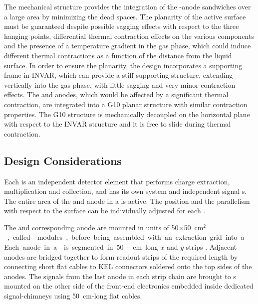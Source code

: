 The  mechanical structure provides the integration of the -anode sandwiches over a large area by minimizing the dead spaces. The planarity of the active surface must be guaranteed despite possible sagging effects with respect to the three hanging points, differential thermal contraction effects on the various  components and the presence of a temperature gradient in the gas phase, which could induce different thermal contractions as a function of the distance from the liquid surface. In order to %
ensure the planarity, the design %
incorporates a supporting frame in INVAR, which %
can provide a stiff supporting structure, extending vertically into the gas phase, with little sagging and %
very minor contraction effects. The  and anodes, which would be affected by a significant thermal contraction, are integrated into a G10 planar structure with similar contraction %
properties. The G10 structure is mechanically decoupled on the horizontal plane with respect to the INVAR structure  and it is free to slide during thermal contraction. 

\subsection{Design Considerations}
\label{sec:fddp-crp-des-consid}

Each  is an independent detector element that performs charge
extraction, multiplication and collection, and has its own  system and independent signal \fdth{}s. The entire area of the  and anode in a  is active. The position and the parallelism with respect to the \lar surface can be individually adjusted for each .

The  and corresponding anode are mounted in units of \num{50}$\times$\SI{50}{cm$^2$}, called %
 modules, before being assembled with an extraction grid into a . Each anode in a  is segmented in 50-cm long $x$ and $y$ strips . Adjacent  anodes are bridged together to form readout strips of the required length by connecting short flat cables to KEL connectors soldered onto the top sides of the anodes. The signals from the last anode in each  strip chain are brought to \fdth{}s mounted on the other side of the front-end electronics embedded inside dedicated signal-\fdth chimneys using \SI{50}{cm}-long flat cables.

